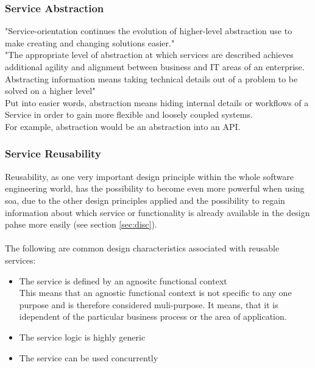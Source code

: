 \documentclass[12pt]{article}
\begin{document}
\subsubsection{Service Abstraction}
"Service-orientation continues the evolution of higher-level abstraction use to make creating and changing solutions easier."\cite[page 184]{grau}\\
"The appropriate level of abstraction at which services are described achieves additional agility and alignment between business and IT areas of an enterprise. Abstracting information means taking technical details out of a problem to be solved on a higher level"\cite[page 184]{grau}\\
Put into easier words, abstraction means hiding internal details or workflows of a Service in order to gain more flexible and loosely coupled systems. \cite[page 87]{te}
\\
For example, abstraction would be an abstraction into an API.\\
\subsubsection{Service Reusability}
Reusability, as one very important design principle within the whole software engineering world, has the possibility to become even more powerful when using \gls{soa}, due to the other design principles applied and the possibility to regain information about which service or functionality is already available in the design pahse more easily (see section \ref{sec:disc}). \cite[page 87-88]{te}\\
\\
The following are common design characteristics associated with reusable services:
\begin{itemize}
\item The service is defined by an agnositc functional context \\
	This means that an agnostic functional context is not specific to any one purpose and is therefore considered muli-purpose. It means, that it is idependent of the particular business process or the area of application.
\item The service logic is highly generic %
\item The service can be used concurrently
\end{itemize}
\end{document}
